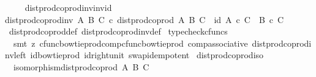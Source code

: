 \begin{isabellebody}
\endisatagproof
{\isafoldproof}%
%
\isadelimproof
\isanewline
%
\endisadelimproof
\ \ \ \isanewline
{}\isamarkupfalse%
\ dist{\isacharunderscore}{\kern0pt}prod{\isacharunderscore}{\kern0pt}coprod{\isacharunderscore}{\kern0pt}inv{}{\isacharunderscore}{\kern0pt}inv{\isacharunderscore}{\kern0pt}id{\isacharcolon}{\kern0pt}\isanewline
{\isachardoublequoteopen}dist{\isacharunderscore}{\kern0pt}prod{\isacharunderscore}{\kern0pt}coprod{\isacharunderscore}{\kern0pt}inv{}\ A\ B\ C\ {\isasymcirc}\isactrlsub c\ dist{\isacharunderscore}{\kern0pt}prod{\isacharunderscore}{\kern0pt}coprod{}\ A\ B\ C\ {\isacharequal}{\kern0pt}\ id\ {\isacharparenleft}{\kern0pt}{\isacharparenleft}{\kern0pt}A\ {\isasymtimes}\isactrlsub c\ C{\isacharparenright}{\kern0pt}\ {\isasymCoprod}\ {\isacharparenleft}{\kern0pt}B\ {\isasymtimes}\isactrlsub c\ C{\isacharparenright}{\kern0pt}{\isacharparenright}{\kern0pt}{\isachardoublequoteclose}\isanewline
%
\isadelimproof
\ \ %
\endisadelimproof
%
\isatagproof
{}\isamarkupfalse%
\ dist{\isacharunderscore}{\kern0pt}prod{\isacharunderscore}{\kern0pt}coprod{}{\isacharunderscore}{\kern0pt}def\ dist{\isacharunderscore}{\kern0pt}prod{\isacharunderscore}{\kern0pt}coprod{\isacharunderscore}{\kern0pt}inv{}{\isacharunderscore}{\kern0pt}def\ \isamarkupfalse%
{\isacharparenleft}{\kern0pt}{\isacharminus}{\kern0pt}{\isacharcomma}{\kern0pt}typecheck{\isacharunderscore}{\kern0pt}cfuncs{\isacharcomma}{\kern0pt}\isanewline
\ \ smt\ {\isacharparenleft}{\kern0pt}z{}{\isacharparenright}{\kern0pt}\ cfunc{\isacharunderscore}{\kern0pt}bowtie{\isacharunderscore}{\kern0pt}prod{\isacharunderscore}{\kern0pt}comp{\isacharunderscore}{\kern0pt}cfunc{\isacharunderscore}{\kern0pt}bowtie{\isacharunderscore}{\kern0pt}prod\ comp{\isacharunderscore}{\kern0pt}associative{}\ dist{\isacharunderscore}{\kern0pt}prod{\isacharunderscore}{\kern0pt}coprod{\isacharunderscore}{\kern0pt}inv{\isacharunderscore}{\kern0pt}left\ id{\isacharunderscore}{\kern0pt}bowtie{\isacharunderscore}{\kern0pt}prod\ id{\isacharunderscore}{\kern0pt}right{\isacharunderscore}{\kern0pt}unit{}\ swap{\isacharunderscore}{\kern0pt}idempotent{\isacharparenright}{\kern0pt}%
\endisatagproof
{\isafoldproof}%
%
\isadelimproof
\isanewline
%
\endisadelimproof
\isanewline
{}\isamarkupfalse%
\ dist{\isacharunderscore}{\kern0pt}prod{\isacharunderscore}{\kern0pt}coprod{}{\isacharunderscore}{\kern0pt}iso{\isacharcolon}{\kern0pt}\isanewline
\ \ {\isachardoublequoteopen}isomorphism{\isacharparenleft}{\kern0pt}dist{\isacharunderscore}{\kern0pt}prod{\isacharunderscore}{\kern0pt}coprod{}\ A\ B\ C{\isacharparenright}{\kern0pt}{\isachardoublequoteclose}\isanewline

\end{isabellebody}
